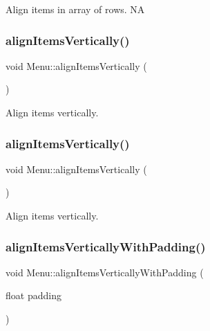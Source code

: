 Align items in array of rows.  NA \mbox{\label{classMenu_a9993bc6d1e63107a1ca661ba64a7ebd4}} 
\subsubsection{\texorpdfstring{align\+Items\+Vertically()}{alignItemsVertically()}\hspace{0.1cm}{\footnotesize\ttfamily [1/2]}}
{\footnotesize\ttfamily void Menu\+::align\+Items\+Vertically (\begin{DoxyParamCaption}{ }\end{DoxyParamCaption})}

Align items vertically. \mbox{\label{classMenu_a9993bc6d1e63107a1ca661ba64a7ebd4}} 
\subsubsection{\texorpdfstring{align\+Items\+Vertically()}{alignItemsVertically()}\hspace{0.1cm}{\footnotesize\ttfamily [2/2]}}
{\footnotesize\ttfamily void Menu\+::align\+Items\+Vertically (\begin{DoxyParamCaption}{ }\end{DoxyParamCaption})}

Align items vertically. \mbox{\label{classMenu_a092a7f04579a919e723587d8cbe1c45d}} 
\subsubsection{\texorpdfstring{align\+Items\+Vertically\+With\+Padding()}{alignItemsVerticallyWithPadding()}\hspace{0.1cm}{\footnotesize\ttfamily [1/2]}}
{\footnotesize\ttfamily void Menu\+::align\+Items\+Vertically\+With\+Padding (\begin{DoxyParamCaption}\item[{float}]{padding }\end{DoxyParamCaption})}

